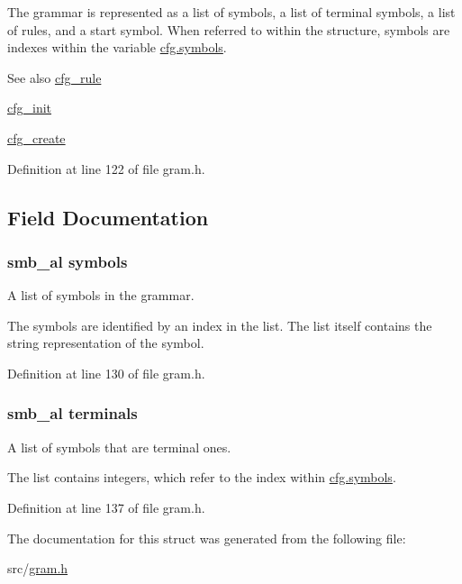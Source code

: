 \-The grammar is represented as a list of symbols, a list of terminal symbols, a list of rules, and a start symbol. \-When referred to within the structure, symbols are indexes within the variable \hyperlink{structcfg_af90e802d07cdf4a88bde8043b57ec666}{cfg.\-symbols}.

\begin{DoxySeeAlso}{\-See also}
\hyperlink{structcfg__rule}{cfg\-\_\-rule} 

\hyperlink{gram_8h_ac3f72e0dc5203203c2b726e3b1e6a0ec}{cfg\-\_\-init} 

\hyperlink{gram_8h_a3bbb21266337299e9acb6241b547f121}{cfg\-\_\-create} 
\end{DoxySeeAlso}


\-Definition at line 122 of file gram.\-h.



\subsection{\-Field \-Documentation}
\hypertarget{structcfg_af90e802d07cdf4a88bde8043b57ec666}{
\subsubsection[{symbols}]{\setlength{\rightskip}{0pt plus 5cm}smb\-\_\-al {\bf symbols}}}\label{structcfg_af90e802d07cdf4a88bde8043b57ec666}


\-A list of symbols in the grammar. 

\-The symbols are identified by an index in the list. \-The list itself contains the string representation of the symbol. 

\-Definition at line 130 of file gram.\-h.

\hypertarget{structcfg_ae85a135e82c4af0e75739a21b3ec03b4}{
\subsubsection[{terminals}]{\setlength{\rightskip}{0pt plus 5cm}smb\-\_\-al {\bf terminals}}}\label{structcfg_ae85a135e82c4af0e75739a21b3ec03b4}


\-A list of symbols that are terminal ones. 

\-The list contains integers, which refer to the index within \hyperlink{structcfg_af90e802d07cdf4a88bde8043b57ec666}{cfg.\-symbols}. 

\-Definition at line 137 of file gram.\-h.



\-The documentation for this struct was generated from the following file\-:\begin{DoxyCompactItemize}
\item 
src/\hyperlink{gram_8h}{gram.\-h}\end{DoxyCompactItemize}
